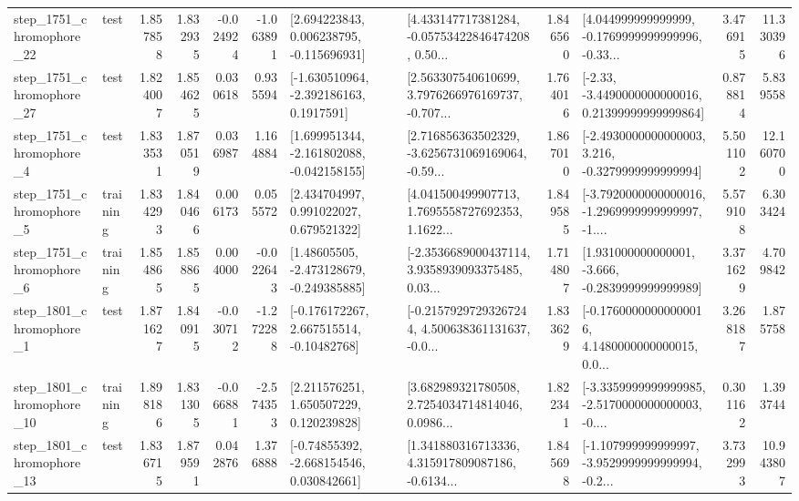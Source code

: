 \begin{tabular}{llrrrrllrlrr}
 step\_1751\_chromophore\_22 &      test &      1.857858 &    1.832935 &     -0.024924 & -1.063891 &    [2.694223843, 0.006238795, -0.115696931] &  [4.433147717381284, -0.05753422846474208, 0.50... &       1.846560 &  [4.044999999999999, -0.1769999999999996, -0.33... &            3.476915 &         11.330396 \\
 step\_1751\_chromophore\_27 &      test &      1.824007 &    1.854625 &      0.030618 &  0.935594 &     [-1.630510964, -2.392186163, 0.1917591] &  [2.563307540610699, 3.7976266976169737, -0.707... &       1.764016 &  [-2.33, -3.4490000000000016, 0.21399999999999864] &            0.878814 &          5.839558 \\
  step\_1751\_chromophore\_4 &      test &      1.833531 &    1.870519 &      0.036987 &  1.164884 &   [1.699951344, -2.161802088, -0.042158155] &  [2.716856363502329, -3.6256731069169064, -0.59... &       1.867010 &  [-2.4930000000000003, 3.216, -0.3279999999999994] &            5.501102 &         12.160700 \\
  step\_1751\_chromophore\_5 &  training &      1.834293 &    1.840466 &      0.006173 &  0.055572 &     [2.434704997, 0.991022027, 0.679521322] &  [4.041500499907713, 1.7695558727692353, 1.1622... &       1.849585 &  [-3.7920000000000016, -1.2969999999999997, -1.... &            5.579108 &          6.303424 \\
  step\_1751\_chromophore\_6 &  training &      1.854865 &    1.858865 &      0.004000 & -0.022643 &    [1.48605505, -2.473128679, -0.249385885] &  [-2.3536689000437114, 3.9358939093375485, 0.03... &       1.714807 &   [1.931000000000001, -3.666, -0.2839999999999989] &            3.371629 &          4.709842 \\
  step\_1801\_chromophore\_1 &      test &      1.871627 &    1.840915 &     -0.030712 & -1.272288 &    [-0.176172267, 2.667515514, -0.10482768] &  [-0.21579297293267244, 4.500638361131637, -0.0... &       1.833629 &  [-0.17600000000000016, 4.1480000000000015, 0.0... &            3.268187 &          1.875758 \\
 step\_1801\_chromophore\_10 &  training &      1.898186 &    1.831305 &     -0.066881 & -2.574353 &     [2.211576251, 1.650507229, 0.120239828] &  [3.682989321780508, 2.7254034714814046, 0.0986... &       1.822341 &  [-3.3359999999999985, -2.5170000000000003, -0.... &            0.301162 &          1.393744 \\
 step\_1801\_chromophore\_13 &      test &      1.836715 &    1.879591 &      0.042876 &  1.376888 &    [-0.74855392, -2.668154546, 0.030842661] &  [1.341880316713336, 4.315917809087186, -0.6134... &       1.845698 &  [-1.107999999999997, -3.9529999999999994, -0.2... &            3.732993 &         10.943807 \\

\end{tabular}
